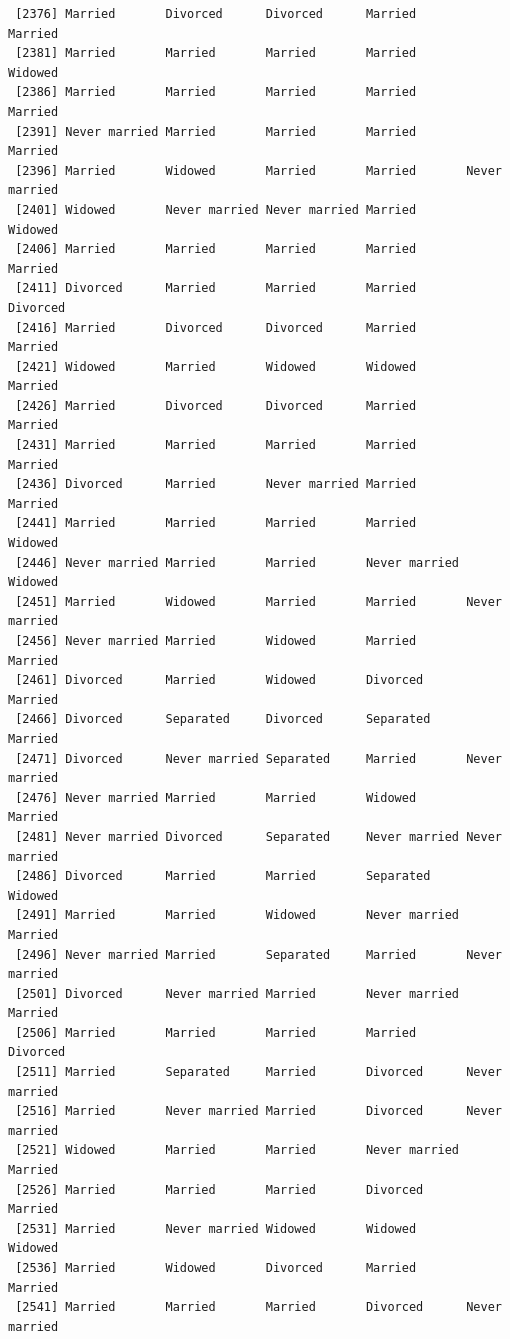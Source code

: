 \documentclass[
  letterpaper,
  DIV=11,
  numbers=noendperiod,
  oneside]{scrartcl}
\begin{document}
\begin{verbatim}
 [2376] Married       Divorced      Divorced      Married       Married      
 [2381] Married       Married       Married       Married       Widowed      
 [2386] Married       Married       Married       Married       Married      
 [2391] Never married Married       Married       Married       Married      
 [2396] Married       Widowed       Married       Married       Never married
 [2401] Widowed       Never married Never married Married       Widowed      
 [2406] Married       Married       Married       Married       Married      
 [2411] Divorced      Married       Married       Married       Divorced     
 [2416] Married       Divorced      Divorced      Married       Married      
 [2421] Widowed       Married       Widowed       Widowed       Married      
 [2426] Married       Divorced      Divorced      Married       Married      
 [2431] Married       Married       Married       Married       Married      
 [2436] Divorced      Married       Never married Married       Married      
 [2441] Married       Married       Married       Married       Widowed      
 [2446] Never married Married       Married       Never married Widowed      
 [2451] Married       Widowed       Married       Married       Never married
 [2456] Never married Married       Widowed       Married       Married      
 [2461] Divorced      Married       Widowed       Divorced      Married      
 [2466] Divorced      Separated     Divorced      Separated     Married      
 [2471] Divorced      Never married Separated     Married       Never married
 [2476] Never married Married       Married       Widowed       Married      
 [2481] Never married Divorced      Separated     Never married Never married
 [2486] Divorced      Married       Married       Separated     Widowed      
 [2491] Married       Married       Widowed       Never married Married      
 [2496] Never married Married       Separated     Married       Never married
 [2501] Divorced      Never married Married       Never married Married      
 [2506] Married       Married       Married       Married       Divorced     
 [2511] Married       Separated     Married       Divorced      Never married
 [2516] Married       Never married Married       Divorced      Never married
 [2521] Widowed       Married       Married       Never married Married      
 [2526] Married       Married       Married       Divorced      Married      
 [2531] Married       Never married Widowed       Widowed       Widowed      
 [2536] Married       Widowed       Divorced      Married       Married      
 [2541] Married       Married       Married       Divorced      Never married

\end{verbatim}
\end{document}
